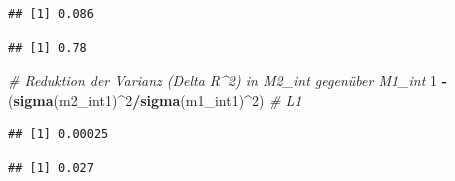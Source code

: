 \documentclass[
]{book}
\newenvironment{Shaded}{\begin{snugshade}}{\end{snugshade}}
\newcommand{\CommentTok}[1]{\textcolor[rgb]{0.56,0.35,0.01}{\textit{#1}}}
\newcommand{\DecValTok}[1]{\textcolor[rgb]{0.00,0.00,0.81}{#1}}
\newcommand{\KeywordTok}[1]{\textcolor[rgb]{0.13,0.29,0.53}{\textbf{#1}}}
\newcommand{\NormalTok}[1]{#1}
\newcommand{\OperatorTok}[1]{\textcolor[rgb]{0.81,0.36,0.00}{\textbf{#1}}}
\newcommand{\StringTok}[1]{\textcolor[rgb]{0.31,0.60,0.02}{#1}}
\begin{document}
\begin{verbatim}
## [1] 0.086
\end{verbatim}

\begin{Shaded}
\end{Shaded}

\begin{verbatim}
## [1] 0.78
\end{verbatim}

\begin{Shaded}
\begin{Highlighting}[]
\CommentTok{# Reduktion der Varianz (Delta R^2) in M2_int gegenüber M1_int}
\DecValTok{1} \OperatorTok{-}\StringTok{ }\NormalTok{(}\KeywordTok{sigma}\NormalTok{(m2_int1)}\OperatorTok{^}\DecValTok{2}\OperatorTok{/}\KeywordTok{sigma}\NormalTok{(m1_int1)}\OperatorTok{^}\DecValTok{2}\NormalTok{)  }\CommentTok{# L1}
\end{Highlighting}
\end{Shaded}

\begin{verbatim}
## [1] 0.00025
\end{verbatim}

\begin{Shaded}
\end{Shaded}

\begin{verbatim}
## [1] 0.027
\end{verbatim}
\end{document}
